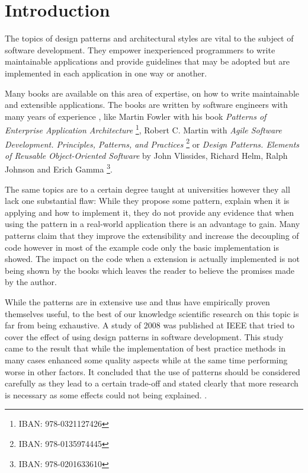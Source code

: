 \chapter{Introduction}

The topics of design patterns and architectural styles are vital to the subject of software development. They empower inexperienced programmers to write maintainable applications and provide guidelines that may be adopted but are implemented in each application in one way or another. 

Many books are available on this area of expertise, on how to write maintainable and extensible applications. The books are written by software engineers with many years of experience , like Martin Fowler with his book \emph{Patterns of Enterprise Application Architecture} \footnote{IBAN: 978-0321127426}, Robert C. Martin with \emph{Agile Software Development. Principles, Patterns, and Practices} \footnote{IBAN: 978-0135974445} or \emph{Design Patterns. Elements of Reusable Object-Oriented Software} by John Vlissides, Richard Helm, Ralph Johnson and Erich Gamma \footnote{IBAN: 978-0201633610}. 

The same topics are to a certain degree taught at universities however they all lack one substantial flaw: While they propose some pattern, explain when it is applying and how to implement it, they do not provide any evidence that when using the pattern in a real-world application there is an advantage to gain.  Many patterns claim that they improve the extensibility and increase the decoupling of code however in most of the example code only the basic implementation is showed. The impact on the code when a extension is actually implemented is not being shown by the books which leaves the reader to believe the promises made by the author. 


While the patterns are in extensive use and thus have empirically proven themselves useful, to the best of our knowledge scientific research on this topic is far from being exhaustive. A study of 2008 was published at IEEE that tried to cover the effect of using design patterns in software development. This study came to the result that while the implementation of best practice methods in many cases enhanced some quality aspects while at the same time performing worse in other factors. It concluded that the use of patterns should be considered carefully as they lead to a certain trade-off and stated clearly that more research is necessary as some effects could not being explained. \cite{quality}.

